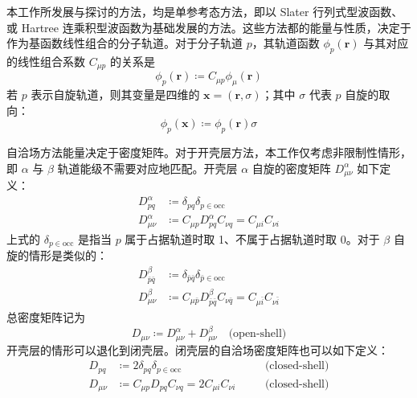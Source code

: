 本工作所发展与探讨的方法，均是单参考态方法，即以 Slater 行列式型波函数、或 Hartree 连乘积型波函数为基础发展的方法。这些方法都的能量与性质，决定于作为基函数线性组合的分子轨道。对于分子轨道 $p$，其轨道函数 $\phi_p (\bm{r})$ 与其对应的线性组合系数 $C_{\mu p}$ 的关系是
\begin{equation}
    \phi_p (\bm{r}) \coloneq C_{\mu p} \phi_\mu (\bm{r})
\end{equation}
若 $p$ 表示自旋轨道，则其变量是四维的 $\bm{x} = (\bm{r}, \sigma)$；其中 $\sigma$ 代表 $p$ 自旋的取向：
\begin{equation}
    \phi_p (\bm{x}) \coloneq \phi_p (\bm{r}) \sigma
\end{equation}

自洽场方法能量决定于密度矩阵。对于开壳层方法，本工作仅考虑非限制性情形，即 $\alpha$ 与 $\beta$ 轨道能级不需要对应地匹配。开壳层 $\alpha$ 自旋的密度矩阵 $D_{\mu \nu}^\alpha$ 如下定义：
\begin{subequations}
\begin{align}
    D_{pq}^\alpha &\coloneq \delta_{pq} \delta_{p \in \mathrm{occ}} \\
    D_{\mu \nu}^\alpha &\coloneq C_{\mu p} D_{pq}^\alpha C_{\nu q} = C_{\mu i} C_{\nu i}
\end{align}
\end{subequations}
上式的 $\delta_{p \in \mathrm{occ}}$ 是指当 $p$ 属于占据轨道时取 1、不属于占据轨道时取 0。对于 $\beta$ 自旋的情形是类似的：
\begin{subequations}
\begin{align}
    D_{\bar p \bar q}^\beta &\coloneq \delta_{\bar p \bar q} \delta_{\bar p \in \mathrm{occ}} \\
    D_{\mu \nu}^\beta &\coloneq C_{\mu \bar p} D_{\bar p \bar q}^\beta C_{\nu \bar q} = C_{\mu \bar i} C_{\nu \bar i}
\end{align}
\end{subequations}
总密度矩阵记为
\begin{equation}
    D_{\mu \nu} \coloneq D_{\mu \nu}^\alpha + D_{\mu \nu}^\beta \quad \text{(open-shell)}
\end{equation}
开壳层的情形可以退化到闭壳层。闭壳层的自洽场密度矩阵也可以如下定义：
\begin{subequations}
\begin{alignat}{10}
    \label{eq.3.def.dm-scf-closed-1}
    D_{pq} &\coloneq 2 \delta_{pq} \delta_{p \in \mathrm{occ}} \quad &&\text{(closed-shell)} \\
    \label{eq.3.def.dm-scf-closed-2}
    D_{\mu \nu} &\coloneq C_{\mu p} D_{pq} C_{\nu q} = 2 C_{\mu i} C_{\nu i} \quad &&\text{(closed-shell)}
\end{alignat}
\end{subequations}

